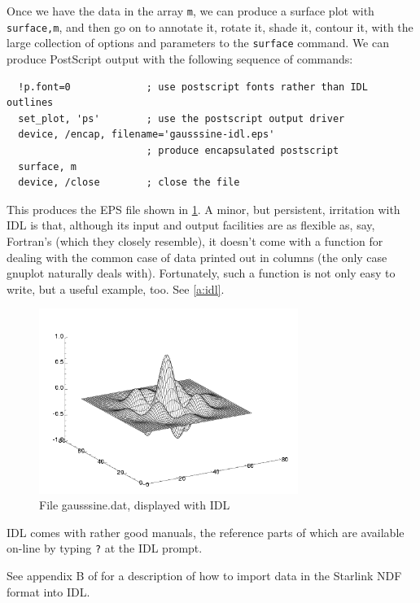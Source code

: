 \documentclass[11pt,oneside,chapters]{starlink}
\begin{document}
Once we have the data in the array \texttt{m}, we can
produce a surface plot with \texttt{surface,m}, and
then go on to annotate it, rotate it, shade it, contour
it, with the large collection of options and parameters to
the \texttt{surface} command.  We can produce
PostScript output with the following sequence of commands:

\begin{verbatim}
  !p.font=0             ; use postscript fonts rather than IDL outlines
  set_plot, 'ps'        ; use the postscript output driver
  device, /encap, filename='gausssine-idl.eps'
                        ; produce encapsulated postscript
  surface, m
  device, /close        ; close the file
\end{verbatim}

This produces the EPS file shown in \ref{f:gausssine:i}.
A minor, but persistent, irritation
with IDL is that, although its input and output facilities
are as flexible as, say, Fortran's (which they closely
resemble), it doesn't come with a function for dealing
with the common case of data printed out in columns (the
only case gnuplot naturally deals with).  Fortunately,
such a function is not only easy to write, but a useful
example, too.  See \ref{a:idl}.

\begin{figure}
\center
\includegraphics[width=0.75\textwidth]{sc13-gausssine-idl}
\caption{File gausssine.dat, displayed with
IDL}
\label{f:gausssine:i}
\end{figure}

IDL comes with rather good manuals, the reference parts
of which are available on-line by typing \texttt{?} at
the IDL prompt.

See appendix B of
for a description of how to import data in the Starlink
NDF format into IDL.
\end{document}
